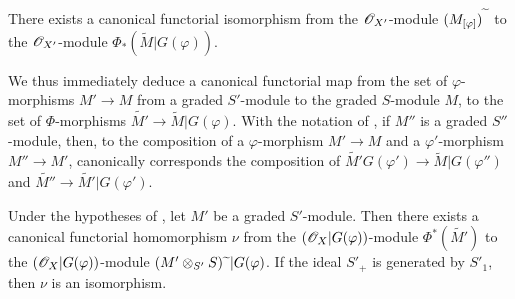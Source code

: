 \begin{proposition}[2.8.7]
\label{II.2.8.7}
There exists a canonical functorial isomorphism from the $\mathscr{O}_{X'}$-module $(M_{[\varphi]})^{\,\widetilde{\,}\,}$ to the $\mathscr{O}_{X'}$-module $\Phi_*(\widetilde{M}|G(\varphi))$.
\end{proposition}

We thus immediately deduce a canonical functorial map from the set of $\varphi$-morphisms $M'\to M$ from a graded $S'$-module to the graded $S$-module $M$, to the set of $\Phi$-morphisms $\widetilde{M'}\to\widetilde{M}|G(\varphi)$.
With the notation of , if $M''$ is a graded $S''$-module, then, to the composition of a $\varphi$-morphism $M'\to M$ and a $\varphi'$-morphism $M''\to M'$, canonically corresponds the composition of $\widetilde{M'}G(\varphi')\to\widetilde{M}|G(\varphi'')$ and $\widetilde{M''}\to\widetilde{M'}|G(\varphi')$.

\begin{proposition}[2.8.8]
\label{II.2.8.8}
Under the hypotheses of , let $M'$ be a graded $S'$-module.
Then there exists a canonical functorial homomorphism $\nu$ from the $(\mathscr{O}_X|G(\varphi))$-module $\Phi^*(\widetilde{M'})$ to the $(\mathscr{O}_X|G(\varphi))$-module $(M'\otimes_{S'}S){\,\widetilde{\,}\,}|G(\varphi)$.
If the ideal $S'_+$ is generated by $S'_1$, then $\nu$ is an isomorphism.
\end{proposition}

